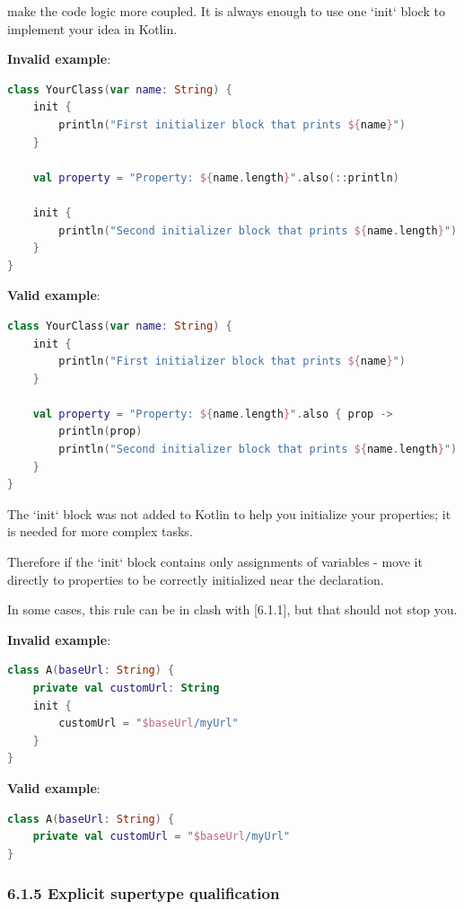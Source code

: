{{{{make the code logic more coupled. It is always enough to use one `init` block to implement your idea in Kotlin.



\textbf{Invalid example}:

\begin{lstlisting}[language=Kotlin]
class YourClass(var name: String) {    
    init {
        println("First initializer block that prints ${name}")
    }
    
    val property = "Property: ${name.length}".also(::println)
    
    init {
        println("Second initializer block that prints ${name.length}")
    }
}
\end{lstlisting}


\textbf{Valid example}:

\begin{lstlisting}[language=Kotlin]
class YourClass(var name: String) {
    init {
        println("First initializer block that prints ${name}")
    }

    val property = "Property: ${name.length}".also { prop ->
        println(prop)
        println("Second initializer block that prints ${name.length}")
    }
}
\end{lstlisting}


The `init` block was not added to Kotlin to help you initialize your properties; it is needed for more complex tasks. 

Therefore if the `init` block contains only assignments of variables - move it directly to properties to be correctly initialized near the declaration.

In some cases, this rule can be in clash with [6.1.1], but that should not stop you.



\textbf{Invalid example}:

\begin{lstlisting}[language=Kotlin]
class A(baseUrl: String) {
    private val customUrl: String
    init {
        customUrl = "$baseUrl/myUrl"
    }
}
\end{lstlisting}


\textbf{Valid example}:

\begin{lstlisting}[language=Kotlin]
class A(baseUrl: String) {
    private val customUrl = "$baseUrl/myUrl"
}
\end{lstlisting}


\subsubsection*{\textbf{6.1.5 Explicit supertype qualification}}
\leavevmode\newline

}}}}
